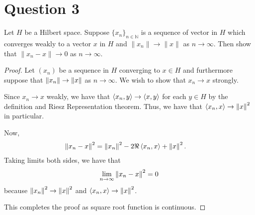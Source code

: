 \section{Question 3}
\horz
Let $H$ be a Hilbert space. Suppose $\{x_n\}_{n\in\mathbb N}$ is a sequence of vector in $H$ which converges weakly to a vector $x$ in $H$ and $\|x_n\| \to \|x\|$ as $n\to \infty.$ Then show that $\|x_n-x\|\to 0$ as $n\to\infty.$ 
\horz

\begin{proof}
    Let $\left( x_{n} \right)$ be a sequence in $H$ converging to $x\in H$ and furthermore suppose that $\left\lVert x_{n} \right\rVert \to \left\lVert x \right\rVert$ as $n\to \infty$. We wish to show that $x_{n} \to x$ strongly.

    Since $x_{n} \to x$ weakly, we have that $\left\langle x_{n}, y \right\rangle \to \left\langle x, y \right\rangle$ for each $y\in H$ by the definition and Riesz Representation theorem.
    Thus, we have that $\left\langle x_{n},x  \right\rangle \to \left\lVert x \right\rVert^{2}$ in particular.

    Now, 
    \begin{align*}
	\left\lVert x_{n} -x \right\rVert^{2} &= \left\lVert x_{n} \right\rVert^{2} - 2 \Re \left\langle x_{n}, x \right\rangle + \left\lVert x \right\rVert^{2}.
    \end{align*}
    Taking limits both sides, we have that
    \begin{align*}
	\lim_{n\to \infty} \left\lVert x_{n}-x \right\rVert^{2} = 0
    \end{align*}
    because $\left\lVert x_{n} \right\rVert^{2} \to \left\lVert x \right\rVert^{2}$ and $\left\langle x_{n}, x \right\rangle\to \left\lVert x \right\rVert^{2}$.

    This completes the proof as square root function is continuous.
\end{proof}
